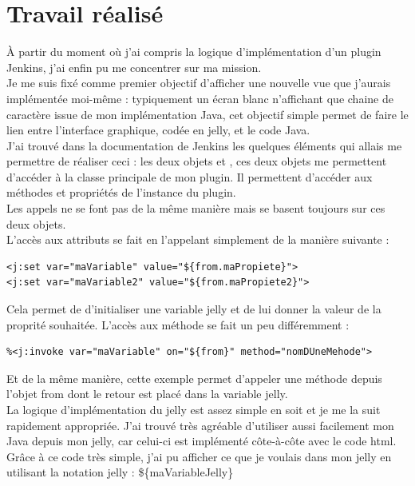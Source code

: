 \section{Travail réalisé}

\`{A} partir du moment où j'ai compris la logique d'implémentation d'un plugin Jenkins, j'ai enfin pu me concentrer sur ma mission.\\
Je me suis fixé comme premier objectif d'afficher une nouvelle vue que j'aurais implémentée moi-même : typiquement un écran blanc n'affichant que chaine de caractère issue de mon implémentation \gls{Java}, cet objectif simple permet de faire le lien entre l'interface graphique, codée en jelly, et le code \gls{Java}.\\
J'ai trouvé dans la documentation de Jenkins les quelques éléments qui allais me permettre de réaliser ceci : les deux objets  et , ces deux objets me permettent d'accéder à la classe principale de mon plugin. Il permettent d'accéder aux méthodes et propriétés de l'instance du plugin.\\
Les appels ne se font pas de la même manière mais se basent toujours sur ces deux objets.\\

L'accès aux attributs se fait en l'appelant simplement de la manière suivante :
\begin{lstlisting}
<j:set var="maVariable" value="${from.maPropiete}">
<j:set var="maVariable2" value="${from.maPropiete2}">
\end{lstlisting}
Cela permet de d'initialiser une variable jelly et de lui donner la valeur de la proprité souhaitée.
L'accès aux méthode se fait un peu différemment :
\begin{lstlisting}
%<j:invoke var="maVariable" on="${from}" method="nomDUneMehode">
\end{lstlisting}
Et de la même manière, cette exemple permet d'appeler une méthode depuis l'objet from dont le retour est placé dans la variable jelly.\\

La logique d'implémentation du jelly est assez simple en soit et je me la suit rapidement appropriée. J'ai trouvé très agréable d'utiliser aussi facilement mon \gls{Java} depuis mon jelly, car celui-ci est implémenté côte-à-côte avec le code html.\\

Grâce à ce code très simple, j'ai pu afficher ce que je voulais dans mon jelly en utilisant la notation jelly : \$\{maVariableJelly\}\\




